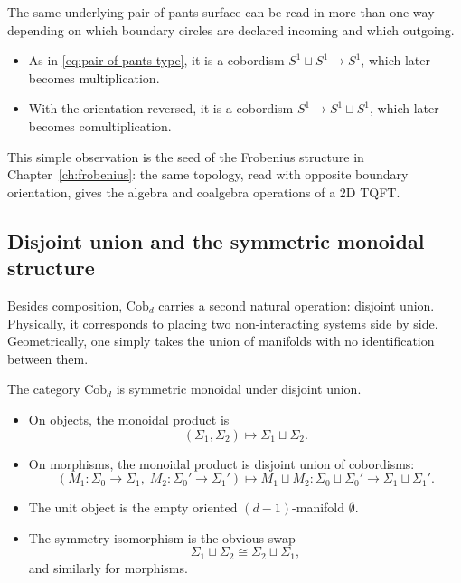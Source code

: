 \begin{example}\label{ex:pair-of-pants}
The same underlying pair-of-pants surface can be read in more than one way depending on which boundary circles are declared incoming and which outgoing.
\begin{itemize}
\item As in \eqref{eq:pair-of-pants-type}, it is a cobordism $S^1 \sqcup S^1 \to S^1$, which later becomes multiplication.
\item With the orientation reversed, it is a cobordism $S^1 \to S^1 \sqcup S^1$, which later becomes comultiplication.
\end{itemize}
This simple observation is the seed of the Frobenius structure in Chapter~\ref{ch:frobenius}: the same topology, read with opposite boundary orientation, gives the algebra and coalgebra operations of a 2D TQFT.
\end{example}

\subsection{Disjoint union and the symmetric monoidal structure}

Besides composition, $\mathrm{Cob}_d$ carries a second natural operation: disjoint union. Physically, it corresponds to placing two non-interacting systems side by side. Geometrically, one simply takes the union of manifolds with no identification between them.

\begin{proposition}\label{prop:Cobd-monoidal}
The category $\mathrm{Cob}_d$ is symmetric monoidal under disjoint union.
\begin{itemize}
\item On objects, the monoidal product is
\begin{equation*}
(\Sigma_1,\Sigma_2) \longmapsto \Sigma_1 \sqcup \Sigma_2.
\end{equation*}
\item On morphisms, the monoidal product is disjoint union of cobordisms:
\begin{equation*}
(M_1 : \Sigma_0 \to \Sigma_1,\; M_2 : \Sigma_0' \to \Sigma_1')
\longmapsto
M_1 \sqcup M_2 : \Sigma_0 \sqcup \Sigma_0' \to \Sigma_1 \sqcup \Sigma_1'.
\end{equation*}
\item The unit object is the empty oriented $(d-1)$-manifold $\emptyset$.
\item The symmetry isomorphism is the obvious swap
\begin{equation*}
\Sigma_1 \sqcup \Sigma_2 \cong \Sigma_2 \sqcup \Sigma_1,
\end{equation*}
and similarly for morphisms.
\end{itemize}
\end{proposition}

